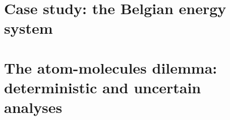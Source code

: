 \documentclass[a4paper,twoside,10pt,final]{memoir} %
\begin{document}
%

\clearemptydoublepage
\chapter{Case study: the Belgian energy system} 
\label{chap:case_study}

\clearpage

\clearemptydoublepage
\chapter{The atom-molecules dilemma: deterministic and uncertain analyses} 
\label{chap:atom_mol}

\clearpage

%


%

%

\end{document}
